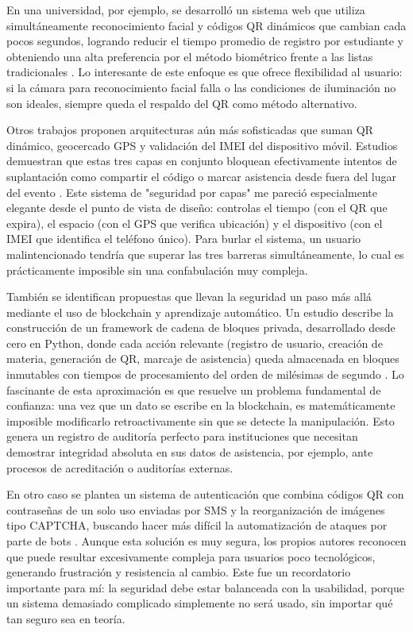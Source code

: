 En una universidad, por ejemplo, se desarrolló un sistema web que utiliza simultáneamente reconocimiento facial y códigos QR dinámicos que cambian cada pocos segundos, logrando reducir el tiempo promedio de registro por estudiante y obteniendo una alta preferencia por el método biométrico frente a las listas tradicionales \cite{siew2023face_qr_attendance}. Lo interesante de este enfoque es que ofrece flexibilidad al usuario: si la cámara para reconocimiento facial falla o las condiciones de iluminación no son ideales, siempre queda el respaldo del QR como método alternativo.

Otros trabajos proponen arquitecturas aún más sofisticadas que suman QR dinámico, geocercado GPS y validación del IMEI del dispositivo móvil. Estudios demuestran que estas tres capas en conjunto bloquean efectivamente intentos de suplantación como compartir el código o marcar asistencia desde fuera del lugar del evento \cite{nwabuwe2023fraud_mitigation_qr}. Este sistema de "seguridad por capas" me pareció especialmente elegante desde el punto de vista de diseño: controlas el tiempo (con el QR que expira), el espacio (con el GPS que verifica ubicación) y el dispositivo (con el IMEI que identifica el teléfono único). Para burlar el sistema, un usuario malintencionado tendría que superar las tres barreras simultáneamente, lo cual es prácticamente imposible sin una confabulación muy compleja.

También se identifican propuestas que llevan la seguridad un paso más allá mediante el uso de blockchain y aprendizaje automático. Un estudio describe la construcción de un framework de cadena de bloques privada, desarrollado desde cero en Python, donde cada acción relevante (registro de usuario, creación de materia, generación de QR, marcaje de asistencia) queda almacenada en bloques inmutables con tiempos de procesamiento del orden de milésimas de segundo \cite{dongre2021iot_blockchain_qr}. Lo fascinante de esta aproximación es que resuelve un problema fundamental de confianza: una vez que un dato se escribe en la blockchain, es matemáticamente imposible modificarlo retroactivamente sin que se detecte la manipulación. Esto genera un registro de auditoría perfecto para instituciones que necesitan demostrar integridad absoluta en sus datos de asistencia, por ejemplo, ante procesos de acreditación o auditorías externas.

En otro caso se plantea un sistema de autenticación que combina códigos QR con contraseñas de un solo uso enviadas por SMS y la reorganización de imágenes tipo CAPTCHA, buscando hacer más difícil la automatización de ataques por parte de bots \cite{brunete2018dynamic_booster_attendance}. Aunque esta solución es muy segura, los propios autores reconocen que puede resultar excesivamente compleja para usuarios poco tecnológicos, generando frustración y resistencia al cambio. Este fue un recordatorio importante para mí: la seguridad debe estar balanceada con la usabilidad, porque un sistema demasiado complicado simplemente no será usado, sin importar qué tan seguro sea en teoría.

